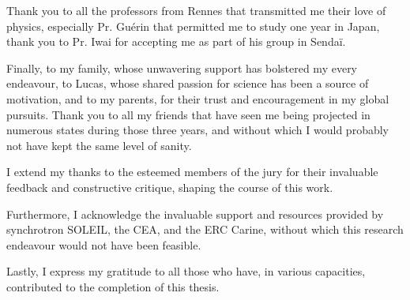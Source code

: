 Thank you to all the professors from Rennes that transmitted me their love of physics, especially Pr. Guérin that permitted me to study one year in Japan, thank you to Pr. Iwai for accepting me as part of his group in Sendaï.

Finally, to my family, whose unwavering support has bolstered my every endeavour, to Lucas, whose shared passion for science has been a source of motivation, and to my parents, for their trust and encouragement in my global pursuits.
Thank you to all my friends that have seen me being projected in numerous states during those three years, and without which I would probably not have kept the same level of sanity.

I extend my thanks to the esteemed members of the jury for their invaluable feedback and constructive critique, shaping the course of this work.

Furthermore, I acknowledge the invaluable support and resources provided by synchrotron SOLEIL, the CEA, and the ERC Carine, without which this research endeavour would not have been feasible.

Lastly, I express my gratitude to all those who have, in various capacities, contributed to the completion of this thesis.

\vspace{\fill} %

\newpage\thispagestyle{empty}\null\newpage
